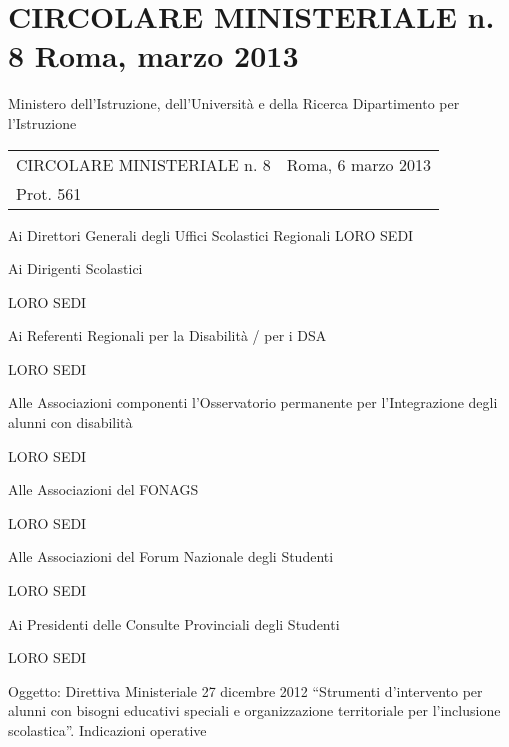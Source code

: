 \chapter[CM n. 8 2013]{CIRCOLARE MINISTERIALE n. 8 Roma, marzo 2013}
\label{cha:cm8_2013}
\begin{center}
Ministero dell'Istruzione, dell'Università e della Ricerca
Dipartimento per l'Istruzione
\end{center}
\begin{tabular*}{\textwidth}%
	{@{\extracolsep{\fill}}lr}
	CIRCOLARE MINISTERIALE n. 8&Roma, 6 marzo 2013\\
	Prot. 561&
\end{tabular*}
\begin{flushright}
Ai Direttori Generali degli Uffici Scolastici Regionali
LORO SEDI

Ai Dirigenti Scolastici

LORO SEDI

Ai Referenti Regionali per la Disabilità / per i DSA

LORO SEDI

Alle Associazioni componenti
l'Osservatorio permanente per l'Integrazione degli alunni con disabilità

LORO SEDI

Alle Associazioni del FONAGS

LORO SEDI

Alle Associazioni del Forum Nazionale degli Studenti

LORO SEDI

Ai Presidenti delle Consulte Provinciali degli Studenti

LORO SEDI
\end{flushright}
Oggetto: Direttiva Ministeriale 27 dicembre 2012 “Strumenti d'intervento per alunni con bisogni educativi speciali e organizzazione territoriale per l'inclusione scolastica”. Indicazioni operative

